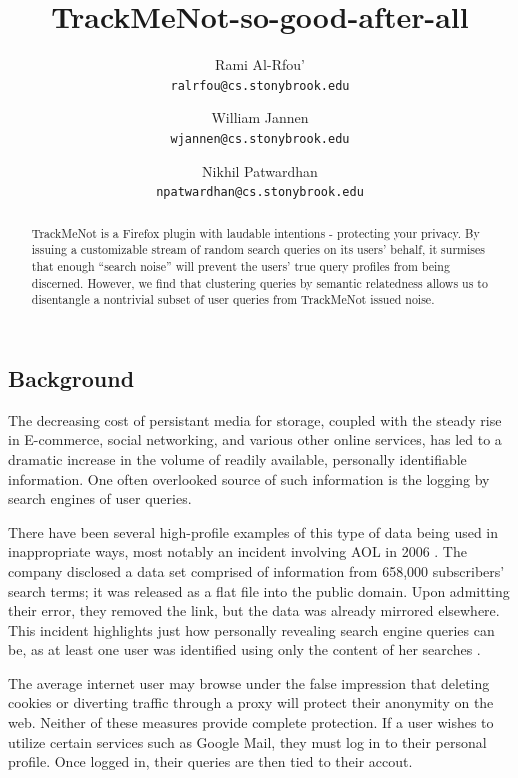 \documentclass[11pt]{article}
\title{TrackMeNot-so-good-after-all}
\author{Rami Al-Rfou' \\{\texttt{ralrfou@cs.stonybrook.edu}}
\and William Jannen \\{\texttt{wjannen@cs.stonybrook.edu}}
\and Nikhil Patwardhan \\{\texttt{npatwardhan@cs.stonybrook.edu}}
}
\begin{document}
\maketitle

\pagestyle{headings}

\begin{abstract}
  TrackMeNot is a Firefox plugin with laudable intentions - protecting
  your privacy. By issuing a customizable stream of random search
  queries on its users' behalf, it surmises that enough ``search
  noise'' will prevent the users' true query profiles from being
  discerned. However, we find that clustering queries by semantic
  relatedness allows us to disentangle a nontrivial subset of user
  queries from TrackMeNot issued noise.
\end{abstract}
\begin{multicols}{2}
\section{Background}
\label{sec:background}

The decreasing cost of persistant media for storage, coupled with the
steady rise in E-commerce, social networking, and various other online
services, has led to a dramatic increase in the volume of readily
available, personally identifiable information. One often overlooked
source of such information is the logging by search engines of user
queries.

There have been several high-profile examples of this type of data
being used in inappropriate ways, most notably an incident involving AOL in 2006 \cite{aol}. The company disclosed a data set comprised of  information from 658,000
subscribers' search terms; it was released as a flat file into the public
domain. Upon admitting their error, they removed the link, but the data was already mirrored elsewhere. This incident highlights just how personally revealing search
engine queries can be, as at least one user was identified using only
the content of her searches \cite{user957}.

The average internet user may browse under the false impression that
deleting cookies or diverting traffic through a proxy will protect
their anonymity on the web. Neither of these measures provide complete
protection. If a user wishes to utilize certain services such as
Google Mail, they must log in to their personal profile. Once logged
in, their queries are then tied to their accout.


\end{multicols}
\end{document}
